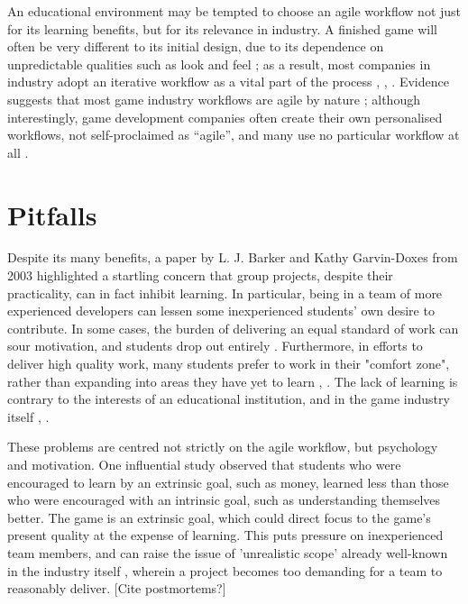 \documentclass{scrartcl}
\begin{document}
An educational environment may be tempted to choose an agile workflow not just for its learning benefits, but for its relevance in industry. A finished game will often be very different to its initial design, due to its dependence on unpredictable qualities such as look and feel \cite{collaboration}; as a result, most companies in industry adopt an iterative workflow as a vital part of the process \cite{iteration}, \cite{olddays}, \cite{devstudy}. Evidence suggests that most game industry workflows are agile by nature \cite{olddays}; although interestingly, game development companies often create their own personalised workflows, not self-proclaimed as ``agile'', and many use no particular workflow at all \cite{devstudy}.


\section{Pitfalls}
Despite its many benefits, a paper by L. J. Barker and Kathy Garvin-Doxes from 2003 highlighted a startling concern that group projects, despite their practicality, can in fact inhibit learning. In particular, being in a team of more experienced developers can lessen some inexperienced students' own desire to contribute. In some cases, the burden of delivering an equal standard of work can sour motivation, and students drop out entirely \cite{group2003}. Furthermore, in efforts to deliver high quality work, many students prefer to work in their "comfort zone", rather than expanding into areas they have yet to learn \cite{group2003}, \cite{group2005}. The lack of learning is contrary to the interests of an educational institution, and in the game industry itself \cite{collaboration}, \cite{devstudy}.

These problems are centred not strictly on the agile workflow, but psychology and motivation. One influential study \cite{motivation} observed that students who were encouraged to learn by an extrinsic goal, such as money, learned less than those who were encouraged with an intrinsic goal, such as understanding themselves better. The game is an extrinsic goal, which could direct focus to the game's present quality at the expense of learning. This puts pressure on inexperienced team members, and can raise the issue of 'unrealistic scope' already well-known in the industry itself \cite{problems}, wherein a project becomes too demanding for a team to reasonably deliver. [Cite postmortems?]
\end{document}
